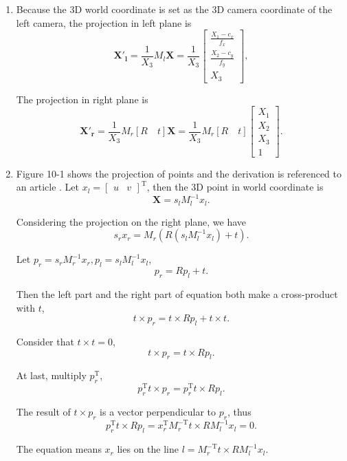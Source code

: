\documentclass{article}
\begin{document}
\begin{enumerate}[resume]

\item Because the 3D world coordinate is set as the 3D camera coordinate of the left camera, the projection in left plane is
$$
\boldsymbol{X'_l} = \frac{1}{X_3} M_l \boldsymbol{X} = \frac{1}{X_3} \begin{bmatrix} \frac{X_1 - c_x}{f_x} \\ \frac{X_2 - c_y}{f_y} \\ X_3 \end{bmatrix} ,
$$

The projection in right plane is
$$
\boldsymbol{X'_r} = \frac{1}{X_3} M_r [R \quad t] \boldsymbol{X} = \frac{1}{X_3} M_r [R \quad t] \begin{bmatrix} X_1 \\ X_2 \\ X_3 \\ 1 \end{bmatrix} .
$$

\item Figure 10-1 shows the projection of points and the derivation is referenced to an article \cite{ref13}. Let $x_l = \begin{bmatrix} u & v \end{bmatrix}^\mathrm T$, then the 3D point in world coordinate is
$$
\boldsymbol X = s_lM_l^{-1}x_l .
$$

Considering the projection on the right plane, we have
$$
s_rx_r = M_r(R(s_lM_l^{-1}x_l) + t) .
$$

Let $p_r = s_rM_r^{-1}x_r, p_l = s_lM_l^{-1}x_l$,
$$
p_r = Rp_l + t.
$$

Then the left part and the right part of equation both make a cross-product with $t$,
$$
t \times p_r = t \times Rp_l + t \times t .
$$

Consider that $t \times t = 0$,
$$
t \times p_r = t \times Rp_l .
$$

At last, multiply $p_r^\mathrm T$,
$$
p_r^\mathrm T t \times p_r = p_r^\mathrm T t \times Rp_l .
$$

The result of $t \times p_r$ is a vector perpendicular to $p_r$, thus
$$
p_r^\mathrm T t \times Rp_l = x_r^\mathrm T M_r^{-\mathrm T} t \times R M_l^{-1}x_l= 0 .
$$

The equation means $x_r$ lies on the line $l = M_r^{-\mathrm T} t \times R M_l^{-1}x_l$.


\end{enumerate}
\end{document}

